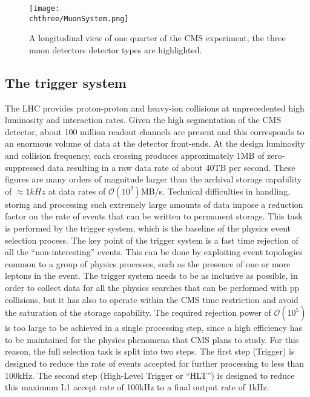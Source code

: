 \begin{figure}[!htb]
 \begin{center}
  \texttt{[image: \\chthree/MuonSystem.png]}
 \end{center}
 \caption{A longitudinal view of one quarter of the CMS experiment; the three muon detectors detector types are highlighted.}
 \label{fig:MuonSystem}
\end{figure}

\subsection{The trigger system}\label{subsec:CMStrigger}

The LHC provides proton-proton and heavy-ion collisions at unprecedented high luminosity and interaction rates.
Given the high segmentation of the CMS detector, about 100 million readout channels are present and this corresponds to an enormous volume of data at the detector front-ends.
At the design luminosity and collision frequency, each crossing produces approximately 1\unit{MB} of zero-suppressed data resulting in a raw data rate of about 40\unit{TB} per second. These figures are many orders of magnitude larger than the archival storage capability of $\approx1\unit{kHz}$ at data rates of $\mathcal{O}(10^2)$\unit{MB/s}.
Technical difficulties in handling, storing and processing such extremely large amounts of data impose a reduction factor on the rate of events that can be written to permanent storage. This task is performed by the trigger system, which is the baseline of the physics event selection process. The key point of the trigger system is a fast time rejection of all the ``non-interesting''
events. This can be done by exploiting event topologies common to a group of physics processes, such as the presence of one or more leptons in the event. The trigger system needs to be as inclusive as possible, in order to collect data for all the physics searches that can be performed with pp collisions, but it has also to operate within the CMS time restriction and avoid the saturation of the storage capability. The required rejection power of $\mathcal{O}(10^5)$ is too large to be achieved in a single processing step, since a high efficiency has to be maintained for the physics phenomena that CMS plans to study. For this reason, the full selection task is split into two steps. The first step (\Lone Trigger) is designed to reduce the rate of events accepted for further processing to less than 100\unit{kHz}. The second step (High-Level Trigger or ``HLT'') is designed to reduce this maximum L1 accept rate of 100\unit{kHz} to a final output rate of 1\unit{kHz}.\\

